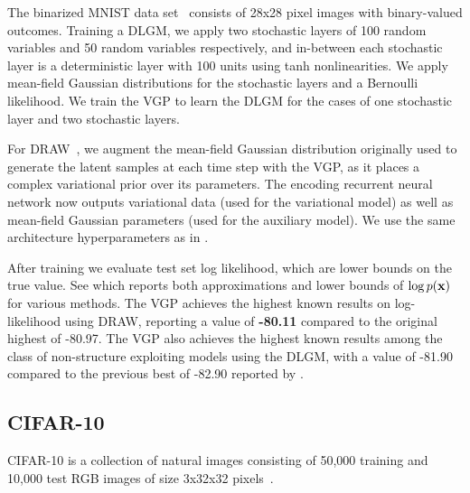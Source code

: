 The binarized MNIST data set~\citep{salakhutdinov2008quantitative}
consists of 28x28 pixel images with binary-valued outcomes.  Training
a \gls{DLGM}, we apply two stochastic layers of 100 random variables
and 50 random variables respectively, and in-between each stochastic
layer is a deterministic layer with 100 units using tanh
nonlinearities. We apply mean-field Gaussian distributions for the
stochastic layers and a Bernoulli likelihood. We train the \gls{VGP}
to learn the \gls{DLGM} for the cases of one stochastic layer and
two stochastic layers.

For \gls{DRAW}~\citep{gregor2015draw}, we augment the
mean-field Gaussian distribution originally used to generate the latent samples
at each time step with the \gls{VGP}, as it places a complex
variational prior over its
parameters. The encoding
recurrent neural network now outputs variational data (used for the
variational model) as well as mean-field
Gaussian parameters (used for the auxiliary model). We use the same architecture hyperparameters as in
\citet{gregor2015draw}.

After training we evaluate test set log likelihood, which are lower
bounds on the true value. See  which reports both
approximations and lower bounds of $\log p(\boldsymbol{\mathbf{x}})$ for various methods.
The \gls{VGP} achieves the highest known results on
log-likelihood using \gls{DRAW}, reporting a value of \textbf{-80.11}
compared to the original highest of {-80.97}.
The \gls{VGP} also achieves the highest known results among the class of
non-structure exploiting models using the \gls{DLGM}, with a value of
{-81.90} compared to the previous best of {-82.90} reported by \citet{burda2015importance}.

\subsection{CIFAR-10}
\PP
CIFAR-10 is a collection of natural images consisting of 50,000
training and 10,000 test RGB images of size 3x32x32
pixels~\citep{krizhevsky2009learning}.

